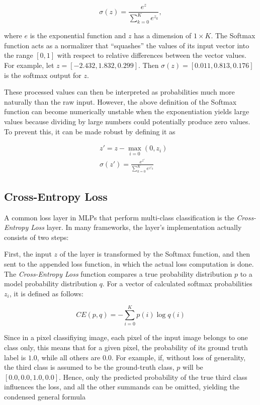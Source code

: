 \[\sigma(z) = \frac{e^{z}}{\sum_{k=0}^{K} e^{z_k}},\]

\noindent where $e$ is the exponential function and $z$ has a dimension of $1 \times K$. The Softmax function acts as a normalizer that ``squashes'' the values of its input vector into the range $[0, 1]$ with respect to relative differences between the vector values. For example, let $z = [-2.432, 1.832, 0.299]$. Then $\sigma(z) = [0.011, 0.813, 0.176]$ is the softmax output for $z$.

These processed values can then be interpreted as probabilities much more naturally than the raw input. However, the above definition of the Softmax function can become numerically unstable when the exponentiation yields large values because dividing by large numbers could potentially produce zero values. To prevent this, it can be made robust by defining it as

\begin {align}
	&z' = z - \max \limits_{i = 0}(0, z_i)\\
	&\sigma(z') = \frac{e^{z'}}{\sum_{k=0}^{K} e^{z'_{{k}}}}
\end {align}


		\subsection{Cross-Entropy Loss}
\label{subsec:cross_ent}

A common loss layer in MLPs that perform multi-class classification is the \textit{Cross-Entropy Loss} layer. In many frameworks, the layer's implementation actually consists of two steps:

First, the input $z$ of the layer is transformed by the Softmax function, and then sent to the appended loss function, in which the actual loss computation is done. The \textit{Cross-Entropy Loss} function compares a true probability distribution $p$ to a model probability distribution $q$. For a vector of calculated softmax probabilities $z_i$, it is defined as follows:

\[CE(p, q) = -\sum \limits_{i = 0}^{K} p(i) \log q(i)\]

\noindent Since in a pixel classifiying image, each pixel of the input image belongs to one class only, this means that for a given pixel, the probability of its ground truth label is $1.0$, while all others are $0.0$. For example, if, without loss of generality, the third class is assumed to be the ground-truth class, $p$ will be $[0.0, 0.0, 1.0, 0.0]$.  Hence, only the predicted probability of the true third class influences the loss, and all the other summands can be omitted, yielding the condensed general formula

